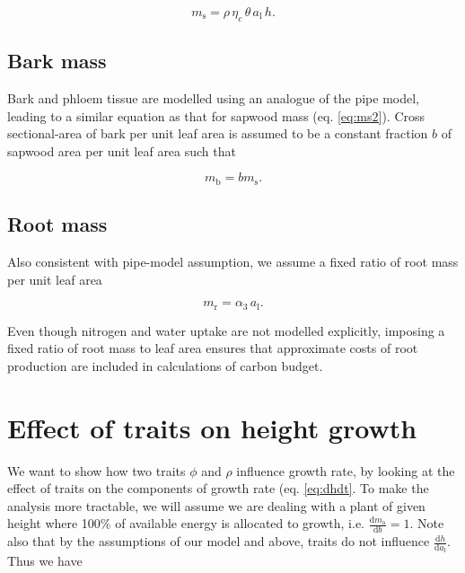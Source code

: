 \documentclass[12pt, a4paper]{article}
\begin{document}
\begin{appendices}
\begin{equation}\label{eq:ms2}
m_\textrm{s}=\rho \, \eta_c \, \theta \, a_\textrm{l} \, h.
\end{equation}

\subsection{Bark mass}\label{bark-mass}

Bark and phloem tissue are modelled using an analogue of the pipe model,
leading to a similar equation as that for sapwood mass (eq.
\ref{eq:ms2}). Cross sectional-area of bark per unit leaf area is
assumed to be a constant fraction $b$ of sapwood area per unit leaf
area such that

\begin{equation}\label{eq:mb}
m_\textrm{b}=b m_\textrm{s}.
\end{equation}

\subsection{Root mass}\label{root-mass}

Also consistent with pipe-model assumption, we assume a fixed ratio of
root mass per unit leaf area

\begin{equation}\label{eq:mr}
m_\textrm{r}=\alpha_3 \, a_\textrm{l}.
\end{equation}

Even though nitrogen and water uptake are not modelled explicitly,
imposing a fixed ratio of root mass to leaf area ensures that
approximate costs of root production are included in calculations of
carbon budget.

\section{Effect of traits on height growth} \label{app:traits_max}

We want to show how two traits $\phi$ and $\rho$ influence growth rate,
by looking at the effect of
traits on the components of growth rate (eq. \ref{eq:dhdt}. To make
the analysis more tractable, we will assume we are dealing with a plant of
given height where 100\% of available energy is allocated to growth,
i.e. $\frac{\textrm{d}m_\textrm{a}}{\textrm{d}b}=1$. Note also
that by the assumptions of our model and above, traits do not influence
$\frac{\textrm{d}h} {\textrm{d}a_\textrm{l}}$. Thus we have


\end{appendices}
\end{document}
